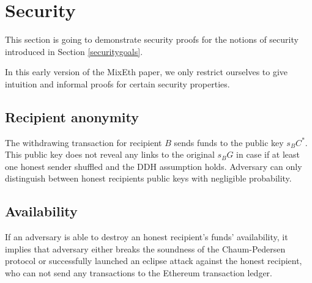 \documentclass[a4paper]{article}
\theoremstyle{definition}
\begin{document}
\section{Security}
This section is going to demonstrate security proofs for the notions of security introduced in Section \ref{securitygoals}.

In this early version of the MixEth paper, we only restrict ourselves to give intuition and informal proofs for certain security properties.

\subsection{Recipient anonymity}
The withdrawing transaction for recipient $B$ sends funds to the public key $s_{B}C^{*}$. This public key does not reveal any links to the original $s_{B}G$ in case if at least one honest sender shuffled and the DDH assumption holds. Adversary can only distinguish between honest recipients public keys with negligible probability.
\subsection{Availability}
If an adversary is able to destroy an honest recipient's funds' availability, it implies that adversary either breaks the soundness of the Chaum-Pedersen protocol or successfully launched an eclipse attack against the honest recipient, who can not send any transactions to the Ethereum transaction ledger. 
\end{document}
